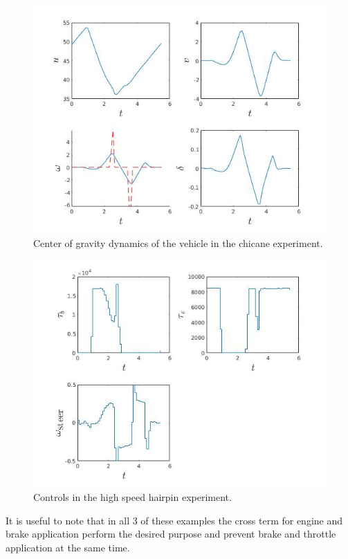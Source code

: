 \documentclass[conference,11pt]{IEEEtran}
\begin{document}
\begin{figure}[t]
  \centering
  \includegraphics[scale=0.5]{chicane_cg.jpg}
  \caption{Center of gravity dynamics of the vehicle in the chicane experiment.}
  \label{fig:cg}
\end{figure}
\begin{figure}[b]
  \centering
  \includegraphics[scale=0.5]{chicane_u.jpg}
  \caption{Controls in the high speed hairpin experiment.}
  \label{fig:cg}
\end{figure}

It is useful to note that in all 3 of these examples the cross term for engine and brake application perform the desired purpose and prevent brake and throttle application at the same time.
\end{document}

